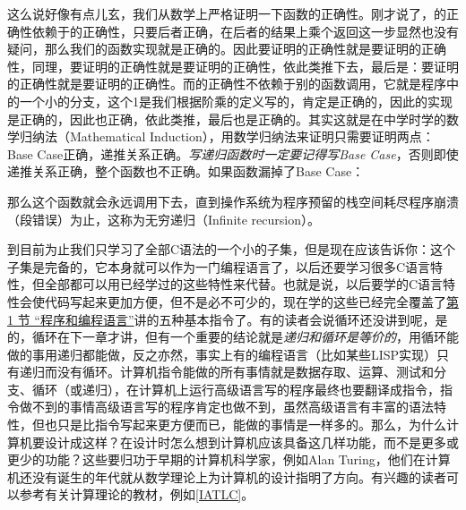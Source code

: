 这么说好像有点儿玄，我们从数学上严格证明一下函数的正确性。刚才说了，的正确性依赖于的正确性，只要后者正确，在后者的结果上乘个返回这一步显然也没有疑问，那么我们的函数实现就是正确的。因此要证明的正确性就是要证明的正确性，同理，要证明的正确性就是要证明的正确性，依此类推下去，最后是：要证明的正确性就是要证明的正确性。而的正确性不依赖于别的函数调用，它就是程序中的一个小的分支，这个1是我们根据阶乘的定义写的，肯定是正确的，因此的实现是正确的，因此也正确，依此类推，最后也是正确的。其实这就是在中学时学的数学归纳法（Mathematical Induction），用数学归纳法来证明只需要证明两点：Base Case正确，递推关系正确。\emph{写递归函数时一定要记得写Base Case}，否则即使递推关系正确，整个函数也不正确。如果函数漏掉了Base Case：




那么这个函数就会永远调用下去，直到操作系统为程序预留的栈空间耗尽程序崩溃（段错误）为止，这称为无穷递归（Infinite recursion）。



到目前为止我们只学习了全部C语法的一个小的子集，但是现在应该告诉你：这个子集是完备的，它本身就可以作为一门编程语言了，以后还要学习很多C语言特性，但全部都可以用已经学过的这些特性来代替。也就是说，以后要学的C语言特性会使代码写起来更加方便，但不是必不可少的，现在学的这些已经完全覆盖了\hyperlink{db.intro.program}{第 1 节 “程序和编程语言”}讲的五种基本指令了。有的读者会说循环还没讲到呢，是的，循环在下一章才讲，但有一个重要的结论就是\emph{递归和循环是等价的}，用循环能做的事用递归都能做，反之亦然，事实上有的编程语言（比如某些LISP实现）只有递归而没有循环。计算机指令能做的所有事情就是数据存取、运算、测试和分支、循环（或递归），在计算机上运行高级语言写的程序最终也要翻译成指令，指令做不到的事情高级语言写的程序肯定也做不到，虽然高级语言有丰富的语法特性，但也只是比指令写起来更方便而已，能做的事情是一样多的。那么，为什么计算机要设计成这样？在设计时怎么想到计算机应该具备这几样功能，而不是更多或更少的功能？这些要归功于早期的计算机科学家，例如Alan Turing，他们在计算机还没有诞生的年代就从数学理论上为计算机的设计指明了方向。有兴趣的读者可以参考有关计算理论的教材，例如\hyperlink{db.bi01.bibli.iatlc}{[IATLC]}。



